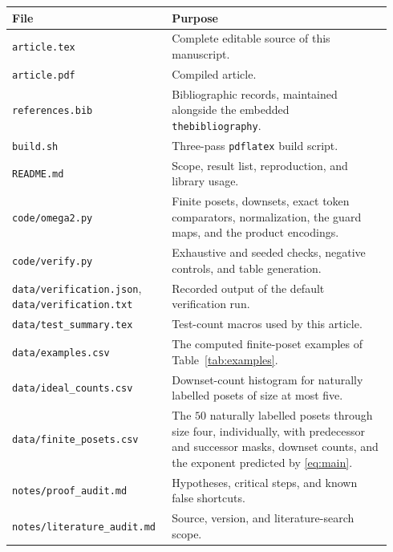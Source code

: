 \documentclass[11pt,a4paper]{article}
\numberwithin{equation}{section}
\theoremstyle{definition}
\theoremstyle{remark}
\begin{document}
\begin{longtable}{@{}p{0.38\linewidth}p{0.56\linewidth}@{}}
\toprule
File & Purpose\\
\midrule
\endhead
\texttt{article.tex} & Complete editable source of this manuscript.\\
\texttt{article.pdf} & Compiled article.\\
\texttt{references.bib} & Bibliographic records, maintained alongside the
  embedded \texttt{thebibliography}.\\
\texttt{build.sh} & Three-pass \texttt{pdflatex} build script.\\
\texttt{README.md} & Scope, result list, reproduction, and library usage.\\
\texttt{code/omega2.py} & Finite posets, downsets, exact token comparators,
  normalization, the guard maps, and the product encodings.\\
\texttt{code/verify.py} & Exhaustive and seeded checks, negative controls,
  and table generation.\\
\texttt{data/verification.json}, \texttt{data/verification.txt}
  & Recorded output of the default verification run.\\
\texttt{data/test\_summary.tex} & Test-count macros used by this article.\\
\texttt{data/examples.csv} & The computed finite-poset examples of
  Table~\ref{tab:examples}.\\
\texttt{data/ideal\_counts.csv} & Downset-count histogram for naturally
  labelled posets of size at most five.\\
\texttt{data/finite\_posets.csv} & The $50$ naturally labelled posets through
  size four, individually, with predecessor and successor masks, downset
  counts, and the exponent predicted by \eqref{eq:main}.\\
\texttt{notes/proof\_audit.md} & Hypotheses, critical steps, and known false
  shortcuts.\\
\texttt{notes/literature\_audit.md} & Source, version, and literature-search
  scope.\\
\bottomrule
\end{longtable}
\end{document}
